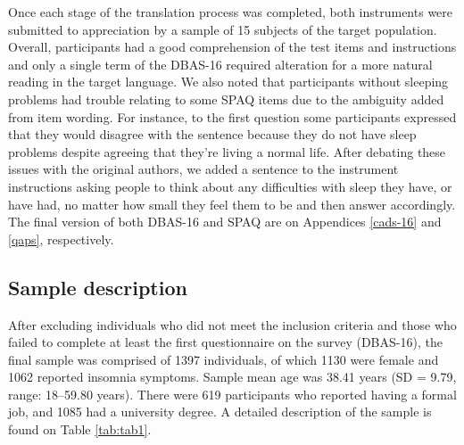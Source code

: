 \documentclass[
  ,doc,11pt, twoside,floatsintext]{apa6}
\begin{document}
Once each stage of the translation process was completed, both instruments were submitted to appreciation by a sample of 15 subjects of the target population. Overall, participants had a good comprehension of the test items and instructions and only a single term of the DBAS-16 required alteration for a more natural reading in the target language. We also noted that participants without sleeping problems had trouble relating to some SPAQ items due to the ambiguity added from item wording. For instance, to the first question some participants expressed that they would disagree with the sentence because they do not have sleep problems despite agreeing that they're living a normal life. After debating these issues with the original authors, we added a sentence to the instrument instructions asking people to think about any difficulties with sleep they have, or have had, no matter how small they feel them to be and then answer accordingly. The final version of both DBAS-16 and SPAQ are on Appendices \ref{cads-16} and \ref{qaps}, respectively.

\hypertarget{sample-description}{%
\subsection{Sample description}\label{sample-description}}

After excluding individuals who did not meet the inclusion criteria and those who failed to complete at least the first questionnaire on the survey (DBAS-16), the final sample was comprised of 1397 individuals, of which 1130 were female and 1062 reported insomnia symptoms. Sample mean age was 38.41 years (SD = 9.79, range: 18--59.80 years). There were 619 participants who reported having a formal job, and 1085 had a university degree. A detailed description of the sample is found on Table \ref{tab:tab1}.
\end{document}
